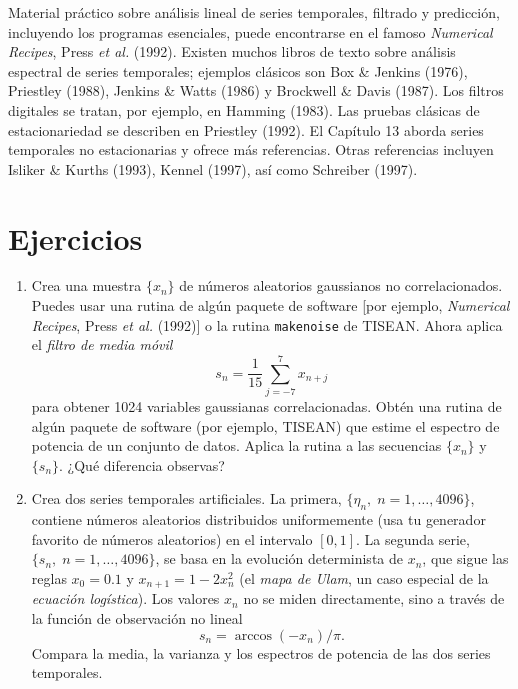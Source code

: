 \documentclass[10pt,a4paper]{book}
\begin{document}
Material práctico sobre análisis lineal de series temporales, filtrado y predicción, incluyendo los programas esenciales, puede encontrarse en el famoso \textit{Numerical Recipes}, Press \textit{et al.} (1992). Existen muchos libros de texto sobre análisis espectral de series temporales; ejemplos clásicos son Box \& Jenkins (1976), Priestley (1988), Jenkins \& Watts (1986) y Brockwell \& Davis (1987). Los filtros digitales se tratan, por ejemplo, en Hamming (1983). Las pruebas clásicas de estacionariedad se describen en Priestley (1992). El Capítulo 13 aborda series temporales no estacionarias y ofrece más referencias. Otras referencias incluyen Isliker \& Kurths (1993), Kennel (1997), así como Schreiber (1997).

\newpage

\section{Ejercicios}

\begin{enumerate}
    \item[2.1] Crea una muestra $\{x_n\}$ de números aleatorios gaussianos no correlacionados. Puedes usar una rutina de algún paquete de software [por ejemplo, \textit{Numerical Recipes}, Press \textit{et al.} (1992)] o la rutina \texttt{makenoise} de TISEAN. Ahora aplica el \textit{filtro de media móvil}
    \[
    s_n = \frac{1}{15} \sum_{j=-7}^{7} x_{n+j}
    \]
    para obtener 1024 variables gaussianas correlacionadas. Obtén una rutina de algún paquete de software (por ejemplo, TISEAN) que estime el espectro de potencia de un conjunto de datos. Aplica la rutina a las secuencias $\{x_n\}$ y $\{s_n\}$. ¿Qué diferencia observas?
	\newpage
    \item[2.2] Crea dos series temporales artificiales. La primera, $\{\eta_n, \; n = 1, \dots, 4096\}$, contiene números aleatorios distribuidos uniformemente (usa tu generador favorito de números aleatorios) en el intervalo $[0,1]$. La segunda serie, $\{s_n, \; n = 1, \dots, 4096\}$, se basa en la evolución determinista de $x_n$, que sigue las reglas $x_0 = 0.1$ y $x_{n+1} = 1 - 2x_n^2$ (el \textit{mapa de Ulam}, un caso especial de la \textit{ecuación logística}). Los valores $x_n$ no se miden directamente, sino a través de la función de observación no lineal
    \[
    s_n = \arccos(-x_n)/\pi.
    \]
    Compara la media, la varianza y los espectros de potencia de las dos series temporales. 
\end{enumerate}
\end{document}
